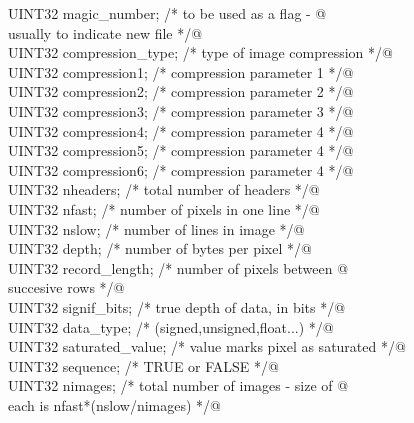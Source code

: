 \documentclass[10pt,a4paper,twoside,notitlepage]{article}
\begin{document}
\begin{flushleft}
\begin{minipage}{\linewidth}
\begin{list}{}{}
\mbox{}\verb@         UINT32        magic_number;     /* to be used as a flag - @\\
\mbox{}\verb@                                            usually  to indicate new file */@\\
\mbox{}\verb@         UINT32        compression_type; /* type of image compression    */@\\
\mbox{}\verb@         UINT32        compression1;     /* compression parameter 1 */@\\
\mbox{}\verb@         UINT32        compression2;     /* compression parameter 2 */@\\
\mbox{}\verb@         UINT32        compression3;     /* compression parameter 3 */@\\
\mbox{}\verb@         UINT32        compression4;     /* compression parameter 4 */@\\
\mbox{}\verb@         UINT32        compression5;     /* compression parameter 4 */@\\
\mbox{}\verb@         UINT32        compression6;     /* compression parameter 4 */@\\
\mbox{}\verb@         UINT32        nheaders;         /* total number of headers      */@\\
\mbox{}\verb@         UINT32        nfast;            /* number of pixels in one line */@\\
\mbox{}\verb@         UINT32        nslow;            /* number of lines in image     */@\\
\mbox{}\verb@         UINT32        depth;            /* number of bytes per pixel    */@\\
\mbox{}\verb@         UINT32        record_length;    /* number of pixels between @\\
\mbox{}\verb@                                            succesive rows */@\\
\mbox{}\verb@         UINT32        signif_bits;      /* true depth of data, in bits  */@\\
\mbox{}\verb@         UINT32        data_type;        /* (signed,unsigned,float...) */@\\
\mbox{}\verb@         UINT32        saturated_value;  /* value marks pixel as saturated */@\\
\mbox{}\verb@         UINT32        sequence;         /* TRUE or FALSE */@\\
\mbox{}\verb@         UINT32        nimages;          /* total number of images - size of @\\
\mbox{}\verb@                                            each is nfast*(nslow/nimages) */@\\

\end{list}
\end{minipage}
\end{flushleft}
\end{document}
